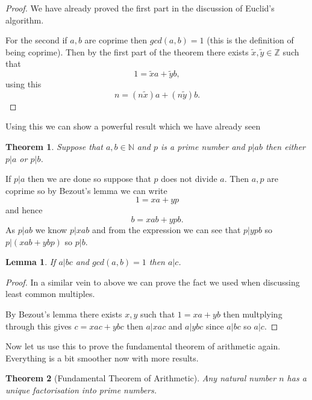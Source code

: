 \documentclass[
]{book}
\newtheorem{theorem}{Theorem}[chapter]
\newtheorem{lemma}{Lemma}[chapter]
\theoremstyle{definition}
\theoremstyle{definition}
\theoremstyle{definition}
\theoremstyle{definition}
\theoremstyle{remark}
\begin{document}
\begin{proof}
We have already proved the first part in the discussion of Euclid's algorithm.

For the second if \(a,b\) are coprime then \(gcd(a,b) =1\) (this is the definition of being coprime). Then by the first part of the theorem there exists \(\tilde{x}, \tilde{y} \in \mathbb{Z}\) such that
\[ 1= \tilde{x}a + \tilde{y}b,  \] using this
\[ n = (n\tilde{x})a + (n \tilde{y})b.  \]
\end{proof}

Using this we can show a powerful result which we have already seen

\begin{theorem}
Suppose that \(a,b \in \mathbb{N}\) and \(p\) is a prime number and \(p|ab\) then either \(p|a\) or \(p|b\).
\end{theorem}

If \(p|a\) then we are done so suppose that \(p\) does not divide \(a\). Then \(a,p\) are coprime so by Bezout's lemma we can write
\[1 = xa + yp\] and hence
\[b = xab + ypb.  \] As \(p|ab\) we know \(p|xab\) and from the expression we can see that \(p|ypb\) so \(p | (xab + ybp)\) so \(p|b\).

\begin{lemma}
If \(a|bc\) and \(gcd(a,b)=1\) then \(a|c\).
\end{lemma}

\begin{proof}
In a similar vein to above we can prove the fact we used when discussing least common multiples.

By Bezout's lemma there exists \(x,y\) such that \(1=xa+yb\) then multplying through this gives \(c=xac +ybc\) then \(a|xac\) and \(a|ybc\) since \(a|bc\) so \(a|c\).
\end{proof}

Now let us use this to prove the fundamental theorem of arithmetic again. Everything is a bit smoother now with more results.

\begin{theorem}[Fundamental Theorem of Arithmetic]
Any natural number \(n\) has a unique factorisation into prime numbers.
\end{theorem}
\end{document}

